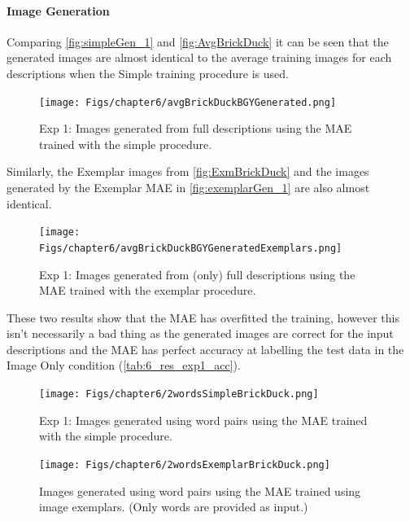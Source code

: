 \paragraph{Image Generation}

Comparing \autoref{fig:simpleGen_1} and \autoref{fig:AvgBrickDuck} it can be seen that the generated images are almost identical to the average training images for each descriptions when the Simple training procedure is used. 

\begin{figure}[ht]
    \centering
    \texttt{[image: Figs/chapter6/avgBrickDuckBGYGenerated.png]}
    \caption{Exp 1: Images generated from full descriptions using the MAE trained with the simple procedure.}
    \label{fig:simpleGen_1}
\end{figure}

Similarly, the Exemplar images from \autoref{fig:ExmBrickDuck} and the images generated by the Exemplar MAE in \autoref{fig:exemplarGen_1} are also almost identical.

\begin{figure}[ht]
    \centering
    \texttt{[image: Figs/chapter6/avgBrickDuckBGYGeneratedExemplars.png]}
    \caption{Exp 1: Images generated from (only) full descriptions using the MAE trained with the exemplar procedure.}
    \label{fig:exemplarGen_1}
\end{figure}

These two results show that the MAE has overfitted the training, however this isn't necessarily a bad thing as the generated images are correct for the input descriptions and the MAE has perfect accuracy at labelling the test data in the Image Only condition (\autoref{tab:6_res_exp1_acc}).



\begin{figure}[ht]
    \centering
    \texttt{[image: Figs/chapter6/2wordsSimpleBrickDuck.png]}
    \caption{Exp 1: Images generated using word pairs using the MAE trained with the simple procedure.}
    \label{fig:2wordsSimpleBrickDuck}
\end{figure}

\begin{figure}[ht]
    \centering
    \texttt{[image: Figs/chapter6/2wordsExemplarBrickDuck.png]}
    \caption{Images generated using word pairs using the MAE trained using image exemplars. (Only words are provided as input.)}
    \label{fig:2wordsExemplarBrickDuck}
\end{figure}


